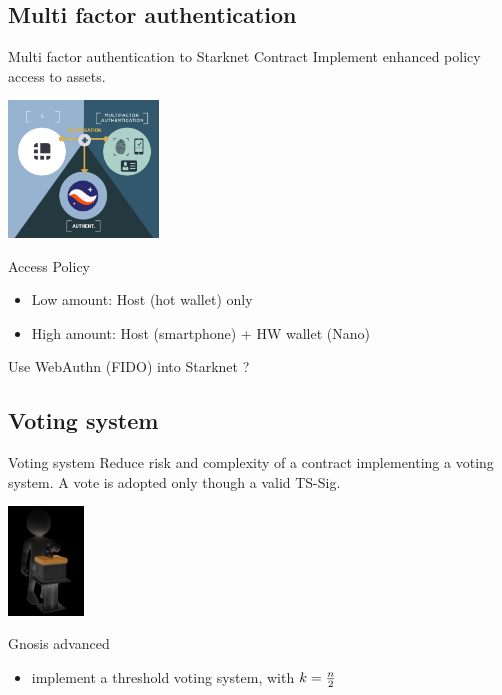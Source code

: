\documentclass[aspectratio=43]{beamer}
\begin{document}
\subsection{Multi factor authentication}

\begin{frame}{Multi factor authentication to Starknet Contract}
Implement enhanced policy access to assets.

\begin{center}
\includegraphics[width=4cm]{images/2fa2.jpg}
\end{center}

\begin{exampleblock}{Access Policy}
\begin{itemize}
\item Low amount: Host (hot wallet) only
\item High amount: Host (smartphone) + HW wallet (Nano) 
\end{itemize}
\end{exampleblock}
Use WebAuthn (FIDO) into Starknet ?

\end{frame} 

\subsection{Voting system}

\begin{frame}{Voting system}
Reduce risk and complexity of a contract implementing a voting system.
A vote is adopted only though a valid TS-Sig.


\begin{center}
\includegraphics[width=2cm]{images/vote.jpg}
\end{center}

\begin{exampleblock}{Gnosis advanced}
\begin{itemize}
\item implement a threshold voting system, with $k={n\over 2}$
\end{itemize}
\end{exampleblock}


\end{frame} 
\end{document}
